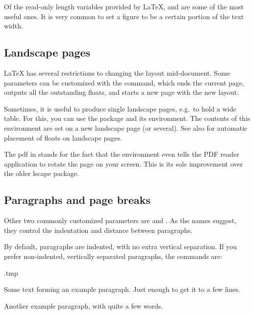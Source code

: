 Of the read-only length variables provided by \LaTeX{},
 and  are some of the most useful ones.
It is very common to set a figure to be a certain portion of the text width.


%
%
\subsection{Landscape pages}\label{sec:landscape pages}

\LaTeX{} has several restrictions to changing the layout mid-document.
Some parameters can be customized with the  command,
which ends the current page, outputs all the outstanding floats,
and starts a new page with the new layout.

Sometimes, it is useful to produce single landscape pages, e.g.\ to hold a wide table.
For this, you can use the  package
and its  environment.
The contents of this environment are set on a new landscape page (or several).
See also  for automatic placement of floats on landscape pages.

\begin{technote}
The \textsf{pdf} in  stands for the fact
that the environment even tells the PDF reader application to rotate the page on your screen.
This is its sole improvement over the older \textsf{lscape} package.
\end{technote}



%
%
\subsection{Paragraphs and page breaks}\label{sec:paragraph layout}

Other two commonly customized parameters are  and .
As the names suggest, they control the indentation and distance between paragraphs.

By default, paragraphs are indented, with no extra vertical separation.
If you prefer non-indented, vertically separated paragraphs, the commands are:
%
\begin{VerbatimOut}{\jobname.tmp}
\setlength\parindent{0pt}
\setlength\parskip{4pt}

Some text forming an example paragraph.
Just enough to get it to a few lines.

Another example paragraph,
with quite a few words.
\end{VerbatimOut}
\ShowExample

